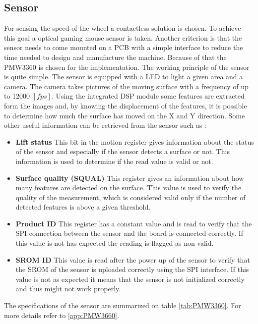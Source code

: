 \documentclass[12pt,a4paper, twoside]{article}
\begin{document}
\subsection{Sensor}\label{sec:sensor}
For sensing the speed of the wheel a contactless solution is chosen. To achieve this goal a optical gaming mouse sensor is taken. Another criterion is that the sensor needs to come mounted on a PCB with a simple interface to reduce the time needed to design and manufacture the machine.
Because of that the PMW3360 is chosen for the implementation.
The working principle of the sensor is quite simple. The sensor is equipped with a LED to light a given area and a camera. The camera takes pictures of the moving surface with a frequency of up to 12000 $[fps]$. Using the integrated DSP module some features are extracted form the images and, by knowing the displacement of the features, it is possible to determine how much the surface has moved on the X and Y direction.
Some other useful information can be retrieved from the sensor such as :
\begin{itemize}
	\item \textbf{Lift status} This bit in the motion register gives information about the status of the sensor and especially if the sensor detects a surface or not. This information is used to determine if the read value is valid or not.
	\item \textbf{Surface quality (SQUAL)} This register gives an information about how many features are detected on the surface. This value is used to verify the quality of the measurement, which is considered valid only if the number of detected features is above a given threshold.
	\item \textbf{Product ID} This register has a constant value and is read to verify that the SPI connection between the sensor and the board is connected correctly. If this value is not has expected the reading is flagged as non valid.
	\item \textbf{SROM ID} This value is read after the power up of the sensor to verify that the SROM of the sensor is uploaded correctly using the SPI interface. If this value is not as expected it means that the sensor is not initialized correctly and thus might not work properly. 
\end{itemize}
The specifications of the sensor are summarized on table \ref{tab:PMW3360}. For more details refer to \ref{app:PMW3660}.
\end{document}
